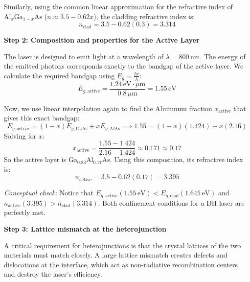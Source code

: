 Similarly, using the common linear approximation for the refractive index of $\text{Al}_x\text{Ga}_{1-x}\text{As}$ ($n \approx 3.5 - 0.62x$), the cladding refractive index is:
\begin{equation*}
  n_{\text{clad}} = 3.5 - 0.62(0.3) = 3.314
\end{equation*}

\textbf{Step 2: Composition and properties for the Active Layer}

The laser is designed to emit light at a wavelength of $\lambda = 800\,\text{nm}$. The energy of the emitted photons corresponds exactly to the bandgap of the active layer. We calculate the required bandgap using $E_g = \frac{hc}{\lambda}$:
\begin{equation*}
  E_{g,\text{active}} = \frac{1.24\,\text{eV}\cdot\mu\text{m}}{0.8\,\mu\text{m}} = 1.55\,\text{eV}
\end{equation*}

Now, we use linear interpolation again to find the Aluminum fraction $x_{\text{active}}$ that gives this exact bandgap:
\begin{equation*}
  E_{g,\text{active}} = (1-x)E_{g,\text{GaAs}} + x E_{g,\text{AlAs}} \implies 1.55 = (1-x)(1.424) + x(2.16)
\end{equation*}
Solving for $x$:
\begin{equation*}
  x_{\text{active}} = \frac{1.55 - 1.424}{2.16 - 1.424} \approx 0.171 \approx 0.17
\end{equation*}
So the active layer is $\text{Ga}_{0.83}\text{Al}_{0.17}\text{As}$. Using this composition, its refractive index is:
\begin{equation*}
  n_{\text{active}} = 3.5 - 0.62(0.17) = 3.395
\end{equation*}

\textit{Conceptual check:} Notice that $E_{g,\text{active}} (1.55\,\text{eV}) < E_{g,\text{clad}} (1.645\,\text{eV})$ and $n_{\text{active}} (3.395) > n_{\text{clad}} (3.314)$. Both confinement conditions for a DH laser are perfectly met.

\textbf{Step 3: Lattice mismatch at the heterojunction}

A critical requirement for heterojunctions is that the crystal lattices of the two materials must match closely. A large lattice mismatch creates defects and dislocations at the interface, which act as non-radiative recombination centers and destroy the laser's efficiency.

